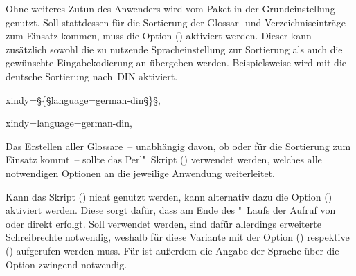 \documentclass[%
  english,ngerman,%
  cdgeometry=no,DIV=12,automark%
]{tudscrartcl}
\begin{document}
Ohne weiteres Zutun des Anwenders wird vom Paket  in der 
Grundeinstellung  genutzt. Soll stattdessen für die 
Sortierung der Glossar- und Verzeichniseinträge  zum Einsatz 
kommen, muss die Option () aktiviert werden.
Dieser kann zusätzlich sowohl die zu nutzende Spracheinstellung zur Sortierung 
als auch die gewünschte Eingabekodierung an  übergeben 
werden. Beispielsweise wird mit 
die deutsche Sortierung nach~DIN aktiviert.
%
%
\begin{Hint}
  xindy=§\{§language=german-din§\}§,
\end{Hint}
\begin{Preamble+}
  xindy={language=german-din},
\end{Preamble+}
%
Das Erstellen aller Glossare~-- unabhängig davon, ob  oder 
 für die Sortierung zum Einsatz kommt~-- sollte das 
Perl"~Skript () verwendet werden, 
welches alle notwendigen Optionen an die jeweilige Anwendung weiterleitet.


Kann das Skript () nicht genutzt 
werden, kann alternativ dazu die Option ()
aktiviert werden. Diese sorgt dafür, dass am Ende des "~Laufs 
der Aufruf von  oder  direkt erfolgt. 
Soll  verwendet werden, sind dafür allerdings erweiterte 
Schreibrechte notwendig, weshalb für diese Variante  mit der 
Option () respektive 
() aufgerufen werden muss. Für 
 ist außerdem die Angabe der Sprache über die Option 
 zwingend notwendig. 
\end{document}
